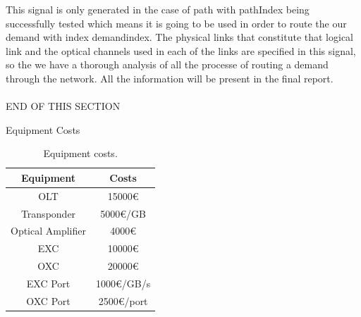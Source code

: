 This signal is only generated in the case of path with pathIndex being successfully tested which means it is going to be used in order to route the our demand with index demandindex. The physical links that constitute that logical link and the optical channels used in each of the links are specified in this signal, so the we have a thorough analysis of all the processe of routing a demand through the network. All the information will be present in the final report.\\ \\ END OF THIS SECTION




Equipment Costs

\begin{table}[H]
	\centering
	\begin{tabular}{|c|c|}
		\hline
		Equipment         & Costs      \\ \hline
		OLT               & 15000\euro     \\ \hline
		Transponder       & 5000\euro/GB   \\ \hline
		Optical Amplifier & 4000\euro      \\ \hline
		EXC               & 10000\euro     \\ \hline
		OXC               & 20000\euro     \\ \hline
		EXC Port          & 1000\euro/GB/s \\ \hline
		OXC Port          & 2500\euro/port \\ \hline
	\end{tabular}
	\caption{Equipment costs.}
	\label{equipment_costs}
\end{table}


